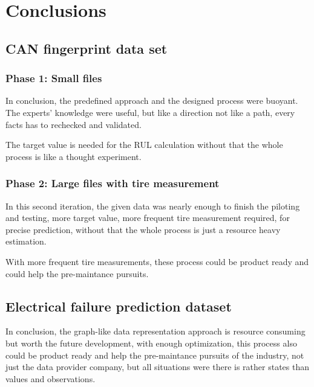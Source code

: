 \chapter{Conclusions}
\section{CAN fingerprint data set}
\subsection{Phase 1: Small files}
In conclusion, the predefined approach and the designed process were buoyant. The experts' knowledge were useful, but like a direction not like a path, every facts has to rechecked and validated.

The target value is needed for the RUL calculation without that the whole process is like a thought experiment. 
\subsection{Phase 2: Large files with tire measurement}
In this second iteration, the given data was nearly enough to finish the piloting and testing, more target value, more frequent tire measurement required, for precise prediction, without that the whole process is just a resource heavy estimation.

With more frequent tire measurements, these process could be product ready and could help the pre-maintance pursuits.

\section{Electrical failure prediction dataset}

In conclusion, the graph-like data representation approach is resource consuming but worth the future development, with enough optimization, this process also could be product ready and help the pre-maintance pursuits of the industry, not just the data provider company, but all situations were there is rather states than values and observations.

